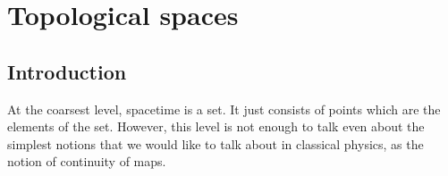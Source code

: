 %

\chapter{Topological spaces}

\section{Introduction}
At the coarsest level, spacetime is a set. It just consists of points which are
the elements of the set. However, this level is not enough to talk even about
the simplest notions that we would like to talk about in classical physics, as
the notion of continuity of maps.

